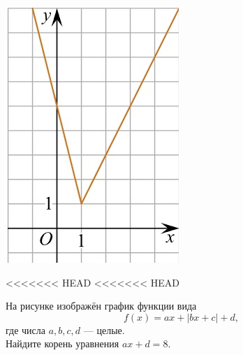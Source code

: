 \begin{class}[number=5]
\begin{listofex}
\begin{minipage}[t]{\bodywidth}
\begin{minipage}[t]{\bodywidth}
\begin{minipage}[t]{\bodywidth}
\begin{minipage}[t]{\bodywidth}
\begin{minipage}[t]{0.43\textwidth}
\begin{minipage}[t]{\bodywidth}
\begin{minipage}[t]{0.43\textwidth}
\begin{minipage}[t]{\bodywidth}
\begin{minipage}[t]{0.43\textwidth}
\begin{minipage}[t]{\bodywidth}
\begin{minipage}[t]{0.43\textwidth}
\begin{minipage}[t]{\bodywidth}
\begin{minipage}[t]{\bodywidth}
\begin{minipage}[t]{\bodywidth}
\begin{minipage}[t]{0.43\textwidth}
\begin{minipage}[t]{0.43\textwidth}
\begin{minipage}[t]{\bodywidth}
\begin{minipage}[t]{0.43\textwidth}
\begin{minipage}[t]{\bodywidth}
\begin{minipage}[t]{0.43\textwidth}
\begin{minipage}[t]{\picwidth}
			\includegraphics[align=t, width=\linewidth]{../pics/G101M4C5-6.jpg}
		\end{minipage}
		\item
<<<<<<< HEAD
<<<<<<< HEAD
		\begin{minipage}[t]{\bodywidth}
			На рисунке изображён график функции вида \[ f(x)=ax+|bx+c|+d, \] где числа \(a, b, c, d\) --- целые.\\ Найдите корень уравнения \(ax+d=8\).
		\end{minipage}

\end{minipage}
\end{minipage}
\end{minipage}
\end{minipage}
\end{minipage}
\end{minipage}
\end{minipage}
\end{minipage}
\end{minipage}
\end{minipage}
\end{minipage}
\end{minipage}
\end{minipage}
\end{minipage}
\end{minipage}
\end{minipage}
\end{minipage}
\end{minipage}
\end{minipage}
\end{minipage}
\end{listofex}
\end{class}
